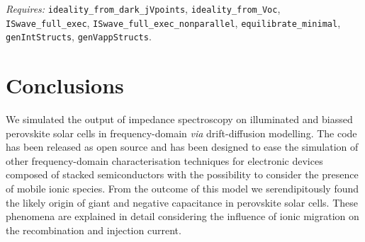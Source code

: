 	\textit{Requires:} \texttt{ideality\_from\_dark\_jVpoints}, \texttt{ideality\_from\_Voc}, \texttt{IS\-wave\_full\_exec}, \texttt{IS\-wave\_full\_exec\_nonparallel}, \texttt{equilibrate\_minimal}, \texttt{gen\-Int\-Structs}, \texttt{gen\-Vapp\-Structs}.


\section{Conclusions}
	We simulated the output of impedance spectroscopy on illuminated and biassed perovskite solar cells in frequency\hyp{}domain \textsl{via} drift\hyp{}diffusion modelling.
	The code has been released as open source and has been designed to ease the simulation of other frequency\hyp{}domain characterisation techniques for electronic devices composed of stacked semiconductors with the possibility to consider the presence of mobile ionic species.
	From the outcome of this model we serendipitously found the likely origin of giant and negative capacitance in perovskite solar cells.
	These phenomena are explained in detail considering the influence of ionic migration on the recombination and injection current.

